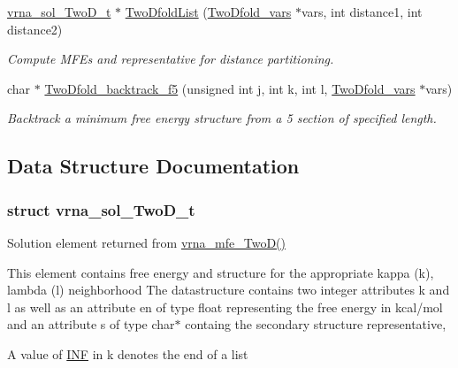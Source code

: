 \begin{DoxyCompactItemize}
\hyperlink{group__kl__neighborhood__mfe_structvrna__sol__TwoD__t}{vrna\+\_\+sol\+\_\+\+Two\+D\+\_\+t} $\ast$ \hyperlink{group__kl__neighborhood__mfe_ga7fc5e3e92fe97914ca4eccd33c01c2a7}{Two\+Dfold\+List} (\hyperlink{group__kl__neighborhood__mfe_structTwoDfold__vars}{Two\+Dfold\+\_\+vars} $\ast$vars, int distance1, int distance2)
\begin{DoxyCompactList}\small\item\em Compute M\+FE\textquotesingle{}s and representative for distance partitioning. \end{DoxyCompactList}\item 
char $\ast$ \hyperlink{group__kl__neighborhood__mfe_gaf4dc05bf8fc1ea53acd7aeb798ba80c2}{Two\+Dfold\+\_\+backtrack\+\_\+f5} (unsigned int j, int k, int l, \hyperlink{group__kl__neighborhood__mfe_structTwoDfold__vars}{Two\+Dfold\+\_\+vars} $\ast$vars)
\begin{DoxyCompactList}\small\item\em Backtrack a minimum free energy structure from a 5\textquotesingle{} section of specified length. \end{DoxyCompactList}\end{DoxyCompactItemize}


\subsection{Data Structure Documentation}
\label{structvrna__sol__TwoD__t}
\subsubsection{struct vrna\+\_\+sol\+\_\+\+Two\+D\+\_\+t}
Solution element returned from \hyperlink{group__kl__neighborhood__mfe_ga243c288b463147352829df04de6a2f77}{vrna\+\_\+mfe\+\_\+\+Two\+D()} 

This element contains free energy and structure for the appropriate kappa (k), lambda (l) neighborhood The datastructure contains two integer attributes \textquotesingle{}k\textquotesingle{} and \textquotesingle{}l\textquotesingle{} as well as an attribute \textquotesingle{}en\textquotesingle{} of type float representing the free energy in kcal/mol and an attribute \textquotesingle{}s\textquotesingle{} of type char$\ast$ containg the secondary structure representative,

A value of \hyperlink{energy__const_8h_a12c2040f25d8e3a7b9e1c2024c618cb6}{I\+NF} in k denotes the end of a list

